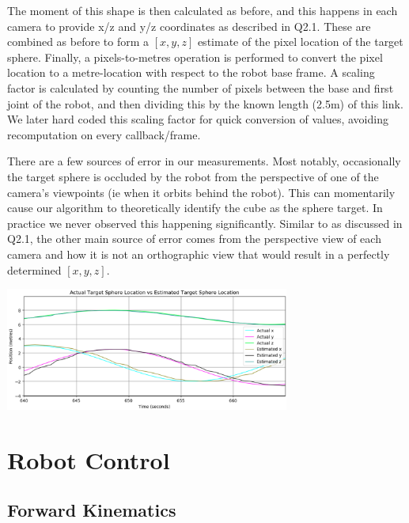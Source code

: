 \documentclass[11pt]{article}
\begin{document}
The moment of this shape is then calculated as before, and this happens in each camera to provide x/z and y/z coordinates as described in Q2.1. These are combined as before to form a $[x,y,z]$ estimate of the pixel location of the target sphere. Finally, a pixels-to-metres operation is performed to convert the pixel location to a metre-location with respect to the robot base frame. A scaling factor is calculated by counting the number of pixels between the base and first joint of the robot, and then dividing this by the known length (2.5m) of this link. We later hard coded this scaling factor for quick conversion of values, avoiding recomputation on every callback/frame.

There are a few sources of error in our measurements. Most notably, occasionally the target sphere is occluded by the robot from the perspective of one of the camera's viewpoints (ie when it orbits behind the robot). This can momentarily cause our algorithm to theoretically identify the cube as the sphere target. In practice we never observed this happening significantly. Similar to as discussed in Q2.1, the other main source of error comes from the perspective view of each camera and how it is not an orthographic view that would result in a perfectly determined $[x,y,z]$.

\begin{center}
    \includegraphics[width=0.7\textwidth]{images/2.2_target.png}
\end{center}

\section{Robot Control}
\subsection{Forward Kinematics}
\end{document}
